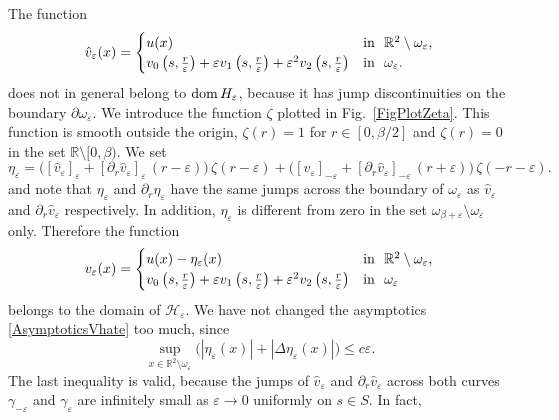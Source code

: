 \documentclass[reqno]{amsart}
\theoremstyle{plain}
\numberwithin{equation}{section}
\newcommand{\dom}{\mathop{\rm dom}}
\newcommand{\Real}{\mathbb R}
\newcommand{\eps}{\varepsilon}
\newcommand{\cH}{\mathcal{H}}
\renewcommand{\leq}{\leqslant}
\newcommand\nep{\textstyle\frac r\eps}
\begin{document}
The function
\begin{equation}\label{AsymptoticsVhate}
 \hat{v}_\eps(x)=
\begin{cases}
  u(x)& \hbox{in \ }\Real^2\setminus \omega_\eps, \\
    v_0\left(s,\nep\right)+\eps v_1\left(s,\nep\right)+\eps^2 v_2\left(s,\nep\right)
&\hbox{in \ } \omega_\eps.
\end{cases}
\end{equation}
does not in general belong to $\dom H_\eps$, because it  has  jump discontinuities on the boundary $\partial\omega_\eps$.
We introduce the function $\zeta$ plotted in Fig.~\ref{FigPlotZeta}. This function is smooth outside the origin,  $\zeta(r)=1$ for $r\in [0,\beta/2]$ and $\zeta(r)=0$ in the set $\Real\setminus [0,\beta)$. We set
\begin{equation*}
  \eta_\eps=\big([\hat{v}_\eps]_{\eps}+[\partial_r\hat{v}_\eps]_{\eps}\,
  (r-\eps)\big)\,\zeta(r-\eps)
  +\big([\hat{v}_\eps]_{-\eps}+[\partial_r\hat{v}_\eps]_{-\eps}\,(r+\eps)\big)
  \,\zeta(-r-\eps).
\end{equation*}
and note that $\eta_\eps$ and $\partial_r\eta_\eps$ have the same jumps across the boundary of $\omega_\eps$ as $\hat{v}_\eps$ and $\partial_r\hat{v}_\eps$ respectively. In addition, $\eta_\eps$ is different from zero in the set $\omega_{\beta+\eps}\setminus\omega_\eps$ only. Therefore the function
\begin{equation}\label{AsymptoticsVe}
 v_\eps(x)=
\begin{cases}
  u(x)-\eta_\eps(x)& \hbox{in \ }\Real^2\setminus \omega_\eps, \\
    v_0\left(s,\nep\right)+\eps v_1\left(s,\nep\right)+\eps^2 v_2\left(s,\nep\right)
&\hbox{in \ } \omega_\eps
\end{cases}
\end{equation}
belongs to the domain of $\cH_\eps$.
We have not changed the asymptotics \eqref{AsymptoticsVhate} too much, since
\begin{equation}\label{EtaEpsEstimate}
  \sup_{x\in \Real^2\setminus \omega_\eps}\big(|\eta_\eps(x)|+|\Delta\eta_\eps(x)|\big)\leq c\eps.
\end{equation}
The last inequality is valid,  because  the jumps of $\hat{v}_\eps$ and $\partial_r\hat{v}_\eps$ across both curves $\gamma_{-\eps}$ and $\gamma_{\eps}$ are infinitely small as $\eps\to 0$ uniformly on $s\in S$. In fact,
\end{document}
